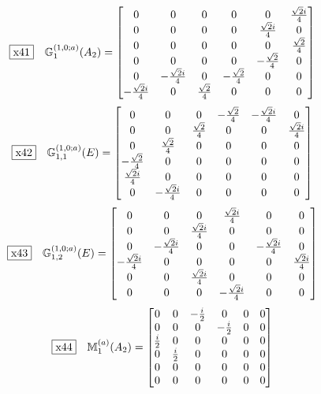 \documentclass[fleqn,10pt,landscape]{jsarticle}
\begin{document}
\begin{dmath*}
\fbox{x41}\quad \mathbb{G}_{1}^{(1,0;a)}(A_{2})=\begin{bmatrix} 0 & 0 & 0 & 0 & 0 & \frac{\sqrt{2} i}{4} \\ 0 & 0 & 0 & 0 & \frac{\sqrt{2} i}{4} & 0 \\ 0 & 0 & 0 & 0 & 0 & \frac{\sqrt{2}}{4} \\ 0 & 0 & 0 & 0 & - \frac{\sqrt{2}}{4} & 0 \\ 0 & - \frac{\sqrt{2} i}{4} & 0 & - \frac{\sqrt{2}}{4} & 0 & 0 \\ - \frac{\sqrt{2} i}{4} & 0 & \frac{\sqrt{2}}{4} & 0 & 0 & 0 \end{bmatrix}
\end{dmath*}
\begin{dmath*}
\fbox{x42}\quad \mathbb{G}_{1,1}^{(1,0;a)}(E)=\begin{bmatrix} 0 & 0 & 0 & - \frac{\sqrt{2}}{4} & - \frac{\sqrt{2} i}{4} & 0 \\ 0 & 0 & \frac{\sqrt{2}}{4} & 0 & 0 & \frac{\sqrt{2} i}{4} \\ 0 & \frac{\sqrt{2}}{4} & 0 & 0 & 0 & 0 \\ - \frac{\sqrt{2}}{4} & 0 & 0 & 0 & 0 & 0 \\ \frac{\sqrt{2} i}{4} & 0 & 0 & 0 & 0 & 0 \\ 0 & - \frac{\sqrt{2} i}{4} & 0 & 0 & 0 & 0 \end{bmatrix}
\end{dmath*}
\begin{dmath*}
\fbox{x43}\quad \mathbb{G}_{1,2}^{(1,0;a)}(E)=\begin{bmatrix} 0 & 0 & 0 & \frac{\sqrt{2} i}{4} & 0 & 0 \\ 0 & 0 & \frac{\sqrt{2} i}{4} & 0 & 0 & 0 \\ 0 & - \frac{\sqrt{2} i}{4} & 0 & 0 & - \frac{\sqrt{2} i}{4} & 0 \\ - \frac{\sqrt{2} i}{4} & 0 & 0 & 0 & 0 & \frac{\sqrt{2} i}{4} \\ 0 & 0 & \frac{\sqrt{2} i}{4} & 0 & 0 & 0 \\ 0 & 0 & 0 & - \frac{\sqrt{2} i}{4} & 0 & 0 \end{bmatrix}
\end{dmath*}
\begin{dmath*}
\fbox{x44}\quad \mathbb{M}_{1}^{(a)}(A_{2})=\begin{bmatrix} 0 & 0 & - \frac{i}{2} & 0 & 0 & 0 \\ 0 & 0 & 0 & - \frac{i}{2} & 0 & 0 \\ \frac{i}{2} & 0 & 0 & 0 & 0 & 0 \\ 0 & \frac{i}{2} & 0 & 0 & 0 & 0 \\ 0 & 0 & 0 & 0 & 0 & 0 \\ 0 & 0 & 0 & 0 & 0 & 0 \end{bmatrix}
\end{dmath*}
\end{document}
